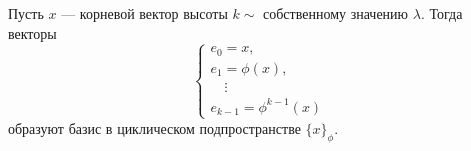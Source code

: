 \vspace{0.2cm}

\begin{shth}
    \begin{theorem}
    \leavevmode \nl 
    
    Пусть \( x \) — корневой вектор высоты \( k \sim \) собственному значению \( \lambda \). Тогда векторы
    \[
    \begin{cases}
        e_0 = x, \\
        e_1 = \phi(x), \\
        \quad \vdots \\
        e_{k-1} = \phi^{k-1}(x)
    \end{cases}
    \]
    образуют базис в циклическом подпространстве \( \{x\}_{\phi} \).
    \end{theorem}
\end{shth}


